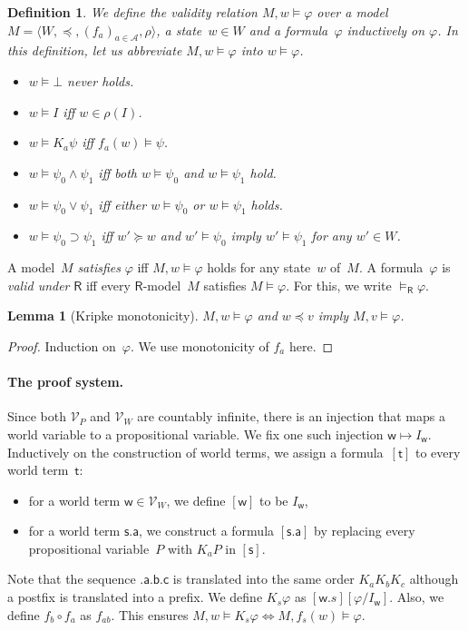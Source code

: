 \documentclass[doctor]{iscs-thesis}
\newcommand{\pvar}{\mathcal V_P}
\newcommand{\agents}{\mathcal A}
\newcommand{\wvar}{\mathcal V_W}
\newcommand{\tuple}[1]{\langle{#1}\rangle}
\newcommand{\modelsR}{\models_{\mathsf R}}
\newtheorem{definition}{Definition}
\newtheorem{lemma}{Lemma}
\begin{document}
\begin{definition}
 We define the \textit{validity relation} $M,w\models\varphi$ over a model
 $M = \tuple{W,\preceq,(f_a)_{a\in \agents},\rho}$, a state~$w\in W$ and a
 formula~$\varphi$ inductively on $\varphi$.
 In this definition, let
 us abbreviate $M,w\models \varphi$ into $w\models \varphi$\enspace.
\newcommand{\m}{}
\begin{itemize}
\item $w\models \bot$ never holds.
\item $w\models I$ iff
$w \in
 \rho(I)$.
\item	    $w\models K_a \psi$ iff
	    $f_a(w)\models \psi$.
\item $w\models \psi_0\wedge\psi_1$ iff both
 $w\models \psi_0$ and $w\models \psi_1$ hold.
\item
 $ w\models \psi_0\vee\psi_1$ iff either
 $ w\models \psi_0$ or $w\models \psi_1$ holds.
\item
	   $w\models \psi_0\supset\psi_1$ iff 
	   $w'\succeq w$ and $w'\models \psi_0$ imply
	   $w'\models\psi_1$ for any $w'\in W$\enspace.
\end{itemize}
\end{definition}
A model~$M$ \textit{satisfies} $\varphi$ iff $M,w\models\varphi$ holds for any
state~$w$ of~$M$.
A formula~$\varphi$ is \textit{valid under} $\mathsf R$ iff
every $\mathsf R$-model~$M$ satisfies $M\models \varphi$.
For this, we write $\modelsR \varphi$\enspace.

\begin{lemma}[Kripke monotonicity]
 \label{monot}
 $M,w\models\varphi$ and $w\preceq v$ imply 
$M,v\models\varphi$.
\end{lemma}
\begin{proof}
 Induction on~$\varphi$.
 We use monotonicity of $f_a$ here.
\end{proof}

\paragraph{The proof system.}
Since both $\pvar$ and $\wvar$ are countably infinite,
there is an injection that maps a world variable to a propositional
variable.
We fix one such injection
$\mathsf w\mapsto I_{\mathsf w}$.
Inductively on the construction of world terms,
we assign a formula~$[\mathsf t]$ to every world term~$\mathsf t$:
\begin{itemize}
 \item for a world term $\mathsf w\in \wvar$, we define $[\mathsf w]$ to be
       $I_{\mathsf w}$,
 \item for a world term $\mathsf{s.a}$, we construct
 a formula $[\mathsf{s.a}]$ by
replacing every propositional variable~$P$ with $K_aP$ in $[\mathsf s]$.
\end{itemize}
Note that the sequence $\mathsf{.a.b.c}$ is translated into the same
order $K_a K_b K_c$ although a postfix is translated into a prefix.
We define $K_s\varphi$ as $[\mathsf w.s][\varphi/I_{\mathsf w}]$.
Also, we define $f_b\circ f_a$ as $f_{ab}$.  This ensures $M, w\models
K_s\varphi\Leftrightarrow M,f_s(w)\models\varphi$.
\end{document}

